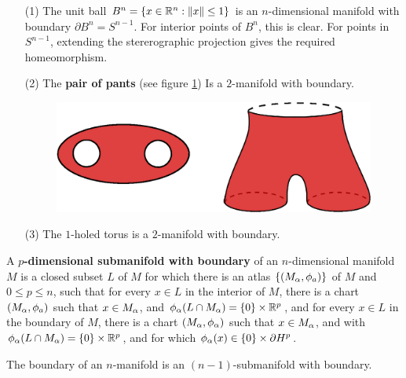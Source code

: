 \begin{example}\label{example_1.3}
    \begin{enumerate}
        \item[(1)] The unit ball $B^n=\{x \in \mathbb{R}^n : \|x\| \leq 1\}$ is an
            $n$-dimensional manifold with boundary  $\partial{B^n}=S^{n-1}$. For
            interior points of $B^n$, this is clear. For points in  $S^{n-1}$,
            extending the stererographic projection gives the required
            homeomorphism.

        \item[(2)] The \textbf{pair of pants} (see figure \ref{fig_1.3}) Is a
            $2$-manifold with boundary.
             \begin{figure}[h]
                \centering
                \includegraphics[scale=0.5]{Figures/Chapter1/pair_of_pants.eps}
                \caption{}
                \label{fig_1.3}
            \end{figure}

        \item[(3)] The $1$-holed torus is a  $2$-manifold with boundary.
    \end{enumerate}
\end{example}

\begin{definition}
    A \textbf{$p$-dimensional submanifold with boundary} of an $n$-dimensional
    manifold  $M$ is a closed subset  $L$ of  $M$ for which there is an atlas
    $\{(M_\alpha,\phi_a)\}$ of $M$ and  $0 \leq p \leq n$, such that for every $x
    \in L$ in the interior of  $M$, there is a chart  $(M_\alpha,\phi_a)$ such that
    $x \in M_\alpha$, and  $\phi_\alpha(L \cap M_\alpha)=\{0\} \times \mathbb{R}^p$, and for every
    $x \in L$ in the boundary of  $M$, there is a chart  $(M_\alpha,\phi_\alpha)$ such
    that $x \in M_\alpha$, and with  $\phi_\alpha(L \cap M_\alpha)=\{0\} \times \mathbb{R}^p$, and
    for which $\phi_\alpha(x) \in \{0\} \times \partial{H^p}$.
\end{definition}

\begin{lemma}\label{1.1.2}
    The boundary of an $n$-manifold is an $(n-1)$-submanifold with boundary.
\end{lemma}

